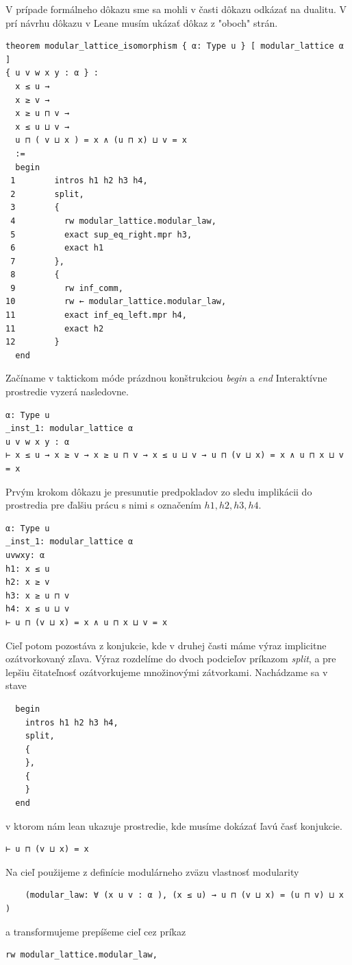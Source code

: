 \documentclass[a4paper,10pt,oneside]{report}%
\begin{document}
    V prípade formálneho dôkazu sme sa mohli v časti dôkazu odkázať na dualitu. 
    V prí návrhu dôkazu v Leane musím ukázať dôkaz z "oboch" strán.

\begin{lstlisting}
theorem modular_lattice_isomorphism { α: Type u } [ modular_lattice α ]
{ u v w x y : α } :
  x ≤ u →
  x ≥ v →
  x ≥ u ⊓ v →
  x ≤ u ⊔ v →
  u ⊓ ( v ⊔ x ) = x ∧ (u ⊓ x) ⊔ v = x
  :=
  begin
 1        intros h1 h2 h3 h4,
 2        split,
 3        {
 4          rw modular_lattice.modular_law,
 5          exact sup_eq_right.mpr h3,
 6          exact h1
 7        },
 8        {
 9          rw inf_comm,
10          rw ← modular_lattice.modular_law,
11          exact inf_eq_left.mpr h4,
11          exact h2
12        }
  end
\end{lstlisting}
    Začíname v taktickom móde prázdnou konštrukciou \emph{begin} a \emph{end}
    Interaktívne prostredie vyzerá nasledovne.
\begin{lstlisting}
α: Type u
_inst_1: modular_lattice α
u v w x y : α
⊢ x ≤ u → x ≥ v → x ≥ u ⊓ v → x ≤ u ⊔ v → u ⊓ (v ⊔ x) = x ∧ u ⊓ x ⊔ v = x
\end{lstlisting}
    Prvým krokom dôkazu je presunutie predpokladov zo sledu implikácii do
prostredia pre ďalšiu prácu s nimi s označením $h1,h2,h3,h4$.
\begin{lstlisting}
α: Type u
_inst_1: modular_lattice α
uvwxy: α
h1: x ≤ u
h2: x ≥ v
h3: x ≥ u ⊓ v
h4: x ≤ u ⊔ v
⊢ u ⊓ (v ⊔ x) = x ∧ u ⊓ x ⊔ v = x
\end{lstlisting}
    Cieľ potom pozostáva z konjukcie, kde v druhej časti máme výraz implicitne
ozátvorkovaný zľava.
    Výraz rozdelíme do dvoch podcieľov príkazom \emph{split}, a pre lepšiu
čitateľnosť ozátvorkujeme množinovými zátvorkami. Nachádzame sa v stave
\begin{lstlisting}
  begin
    intros h1 h2 h3 h4,
    split,
    {
    },
    {
    }
  end
\end{lstlisting}
v ktorom nám lean ukazuje prostredie, kde musíme dokázať ľavú časť konjukcie.
\begin{lstlisting}
⊢ u ⊓ (v ⊔ x) = x
\end{lstlisting}
Na cieľ použijeme z definície modulárneho zväzu vlastnosť modularity
\begin{lstlisting}
    (modular_law: ∀ (x u v : α ), (x ≤ u) → u ⊓ (v ⊔ x) = (u ⊓ v) ⊔ x )
\end{lstlisting}
a transformujeme prepíšeme cieľ cez príkaz
\begin{lstlisting}
rw modular_lattice.modular_law,
\end{lstlisting}
\end{document}

